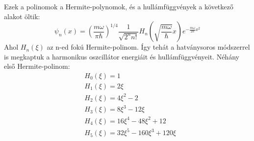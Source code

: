 \documentclass[a4paper,12pt]{article}
\begin{document}
Ezek a polinomok a Hermite-polynomok, és a hullámfüggvények a következő alakot öltik:
\begin{equation}
    \psi_n(x) = \left( \frac{m \omega}{\pi \hbar} \right)^{1/4} \frac{1}{\sqrt{2^n n!}} H_n\left( \sqrt{\frac{m \omega}{\hbar}} x \right) e^{- \frac{m \omega}{2 \hbar} x^2}
\end{equation}
Ahol $H_n(\xi)$ az n-ed fokú Hermite-polinom. Így tehát a hatványsoros módszerrel is megkaptuk a harmonikus oszcillátor energiáit és hullámfüggvényeit.
Néhány első Hermite-polinom:
\begin{equation*}
    \begin{aligned}
    & H_0(\xi) = 1 \\
    & H_1(\xi) = 2 \xi \\
    & H_2(\xi) = 4 \xi^2 - 2 \\
    & H_3(\xi) = 8 \xi^3 - 12 \xi \\
    & H_4(\xi) = 16 \xi^4 - 48 \xi^2 + 12 \\
    & H_5(\xi) = 32 \xi^5 - 160 \xi^3 + 120 \xi \\
    \end{aligned}    
\end{equation*}
\end{document}
